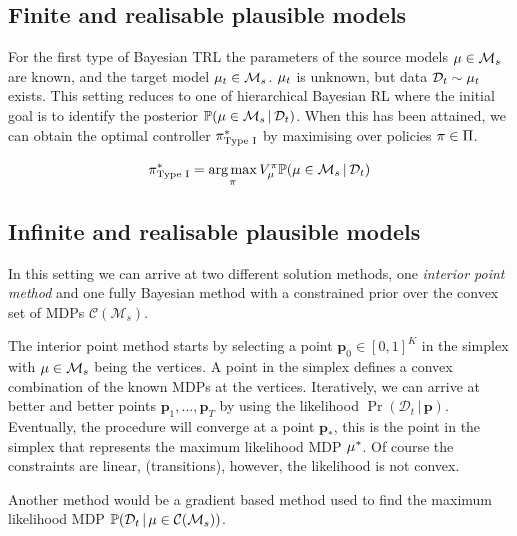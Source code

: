 
\subsection{Finite and realisable plausible models}

For the first type of Bayesian TRL the parameters of the source models $\mu \in \mathcal{M}_s$ are known, and the target model $\mu_t \in \mathcal{M}_s$. $\mu_t$ is unknown, but data $\mathcal{D}_t \sim \mu_t$ exists. This setting reduces to one of hierarchical Bayesian RL where the initial goal is to identify the posterior $\mathbb{P}(\mu \in \mathcal{M}_s \, | \, \mathcal{D}_t)$. When this has been attained, we can obtain the optimal controller $\pi_{\textrm{Type I}}^{*}$ by maximising over policies $\pi \in \Pi$.

\begin{equation}
    \pi_{\textrm{Type I}}^{*} = \underset{\pi}{\arg \max} \, V_\mu^\pi \mathbb{P}(\mu \in \mathcal{M}_s \, | \, \mathcal{D}_t) 
\end{equation}

\subsection{Infinite and realisable plausible models}

In this setting we can arrive at two different solution methods, one \emph{interior point method} and one fully Bayesian method with a constrained prior over the convex set of MDPs $\mathcal{C}(\mathcal{M}_s)$.

The interior point method starts by selecting a point $\bm{p}_0 \in [0, 1]^K$ in the simplex with $\mu \in \mathcal{M}_s$ being the vertices. A point in the simplex defines a convex combination of the known MDPs at the vertices. Iteratively, we can arrive at better and better points $\bm{p}_1, ..., \bm{p}_T$ by using the likelihood $\Pr(\mathcal{D}_t \, | \, \bm{p})$. Eventually, the procedure will converge at a point $\bm{p}_{*}$, this is the point in the simplex that represents the maximum likelihood MDP $\mu^{*}$. Of course the constraints are linear, (transitions), however, the likelihood is not convex.

Another method would be a gradient based method used to find the maximum likelihood MDP $\mathbb{P}(\mathcal{D}_t \, | \, \mu \in \mathcal{C}(\mathcal{M}_s))$.

